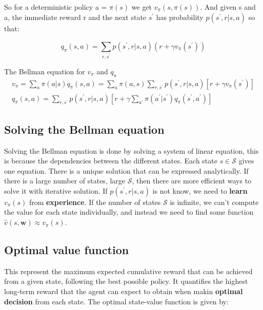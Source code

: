 So for a deterministic policy a = $\pi(s)$ we get $v_\pi(s,\pi(s))$. And given s and a, the immediate reward r and the next state $s^{\prime}$ has probability $p(s^{\prime}, r |s,a)$ so that:

	\begin{equation}
		q_\pi (s,a) = \sum_{r, s^{\prime}}^{} p(s^{\prime},r | s,a) (r + \gamma v_\pi(s^{\prime})) 		
	\end{equation} 


	\begin{wbox}{The Bellman equation for $v_\pi$ and $q_\pi$}
		\begin{equation}
		\begin{aligned}
			v_\pi = \sum_{a}^{} \pi(a |s)q_\pi(s,a) = \sum_{a}^{} \pi(a,s)\sum_{r, s^{\prime}}^{} p(s^{\prime}, r | s, a)[r + \gamma v_\pi(s^{\prime})] \\
			q_\pi(s,a) = \sum_{r, s^{\prime}}^{} p(s^{\prime},r |s,a) [r + \gamma \sum_{a^{\prime}}^{} \pi(a^{\prime} |s^{\prime})q_\pi(s^{\prime},a^{\prime})]
		\end{aligned} 
		\end{equation}
	\end{wbox}

\subsection{Solving the Bellman equation}
Solving the Bellman equation is done by solving a system of linear equation, this is because the dependencies between the different states. Each state $s \in \mathcal{S}$ gives one equation. There is a unique solution that can be expressed analytically. If there is a large number of states, large $\mathcal{S}$,  then there are more efficient ways to solve it with iterative solution. If $p(s^{\prime}, r |s,a)$ is not know, we need to \textbf{learn} $v_\pi(s)$ from \textbf{experience}. If the number of states $\mathcal{S}$ is infinite, we can't compute the value for each state individually, and instead we need to find some function $\hat{v}(s,\textbf{w}) \approx v_\pi(s)$. 


\subsection{Optimal value function}
This represent the maximum expected cumulative reward that can be achieved from a given state, following the best possible policy. It quantifies the highest long-term reward that the agent can expect to obtain when makin \textbf{optimal decision} from each state. The optimal state-value function is given by:

